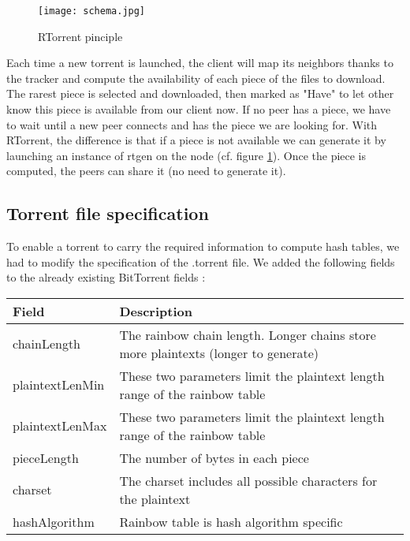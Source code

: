 \documentclass[a4paper]{article}
\begin{document}
{\begin{figure}[H]
  \centering
    \texttt{[image: schema.jpg]}
    \caption{RTorrent pinciple}
    \label{principle}
\end{figure}
\vspace{2mm}

Each time a new torrent is launched, the client will map its neighbors thanks to the tracker and compute the availability of each piece of the files to download. The rarest piece is selected and downloaded, then marked as "Have" to let other know this piece is available from our client now. If no peer has a piece, we have to wait until a new peer connects and has the piece we are looking for. With RTorrent, the difference is that if a piece is not available we can generate it by launching an instance of rtgen on the node (cf. figure \ref{principle}). Once the piece is computed, the peers can share it (no need to generate it).

\subsection{Torrent file specification}

To enable a torrent to carry the required information to compute hash tables, we had to modify the specification 
of the .torrent file. We added the following fields to the already existing BitTorrent fields :

\begin{center}
\begin{tabular}{|l|l|}
\hline 
\textbf{Field} & \textbf{Description} \\ 
\hline 
chainLength & The rainbow chain length. Longer chains store more plaintexts (longer to generate)\\ 
\hline 
plaintextLenMin & These two parameters limit the plaintext length range of the rainbow table\\ 
\hline 
plaintextLenMax & These two parameters limit the plaintext length range of the rainbow table\\ 
\hline 
pieceLength & The number of bytes in each piece\\ 
\hline 
charset & The charset includes all possible characters for the plaintext\\ 
\hline 
hashAlgorithm & Rainbow table is hash algorithm specific\\
\hline 
\end{tabular} 
\end{center}
\vspace{3mm}

}
\end{document}
